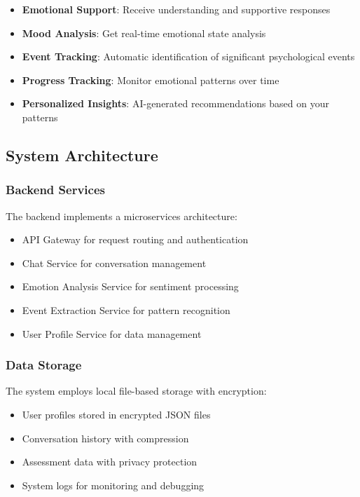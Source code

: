 \begin{itemize}
    \item \textbf{Emotional Support}: Receive understanding and supportive responses
    \item \textbf{Mood Analysis}: Get real-time emotional state analysis
    \item \textbf{Event Tracking}: Automatic identification of significant psychological events
    \item \textbf{Progress Tracking}: Monitor emotional patterns over time
    \item \textbf{Personalized Insights}: AI-generated recommendations based on your patterns
\end{itemize}

\subsection{System Architecture}

\subsubsection{Backend Services}

The backend implements a microservices architecture:

\begin{itemize}
    \item API Gateway for request routing and authentication
    \item Chat Service for conversation management
    \item Emotion Analysis Service for sentiment processing
    \item Event Extraction Service for pattern recognition
    \item User Profile Service for data management
\end{itemize}

\subsubsection{Data Storage}

The system employs local file-based storage with encryption:

\begin{itemize}
    \item User profiles stored in encrypted JSON files
    \item Conversation history with compression
    \item Assessment data with privacy protection
    \item System logs for monitoring and debugging
\end{itemize}

